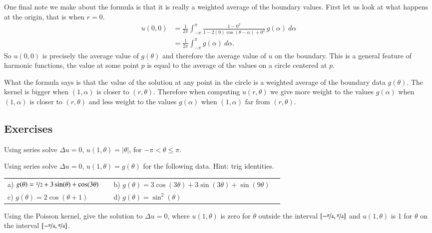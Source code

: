 One final note we make about the formula is that it is really
a weighted average of the boundary values.
First let us look
at what happens at the origin,
that is when $r=0$. %
\begin{equation*}
\begin{split}
u(0,0) &= 
\frac{1}{2\pi} \int_{-\pi}^{\pi}
\frac{1 -0^2}{1 - 2(0)\cos(\theta-\alpha) +0^2} \, g(\alpha) ~ d\alpha
\\
& =
\frac{1}{2\pi} \int_{-\pi}^{\pi}
g(\alpha) ~ d\alpha .
\end{split}
\end{equation*}
So $u(0,0)$ is precisely the average value of $g(\theta)$ and
therefore the average value of $u$ on the boundary.  This is
a general feature of harmonic functions, the value at some point $p$
is equal to the average of the values on a circle centered at $p$.

What the formula says is that the value of the solution at any point in the
circle is a weighted average of the boundary data $g(\theta)$.  The kernel
is bigger when $(1,\alpha)$ is closer to $(r,\theta)$.  Therefore when
computing $u(r,\theta)$ we
give more weight to the values $g(\alpha)$ when $(1,\alpha)$ is closer to $(r,\theta)$ and less
weight to the values $g(\alpha)$ when $(1,\alpha)$ far from $(r,\theta)$.

\subsection{Exercises}

\begin{exercise}
Using series solve
$\Delta u = 0$, $u(1,\theta) = \lvert \theta \rvert$, for $-\pi < \theta
\leq \pi$.
\end{exercise}

\begin{exercise}
Using series solve $\Delta u = 0$, $u(1,\theta) = g(\theta)$ for the
following data.  Hint: trig identities.
\medskip

\noindent
\begin{tabular}{llll}
a)
$g(\theta) = 
\nicefrac{1}{2} + 3\sin(\theta) + \cos(3\theta)$
& &
b)
$g(\theta) = 
3\cos(3\theta) + 3\sin(3\theta) + \sin(9\theta)$
\\
c)
$g(\theta) = 2 \cos(\theta+1)$
& &
d)
$g(\theta) = \sin^2(\theta)$
\end{tabular}
\end{exercise}

\begin{exercise}
Using the Poisson kernel, give the solution to
$\Delta u = 0$, where $u(1,\theta)$ is zero for $\theta$ outside
the interval $[-\nicefrac{\pi}{4},\nicefrac{\pi}{4}]$ and 
$u(1,\theta)$ is 1 for $\theta$ on the interval
$[-\nicefrac{\pi}{4},\nicefrac{\pi}{4}]$.
\end{exercise}


